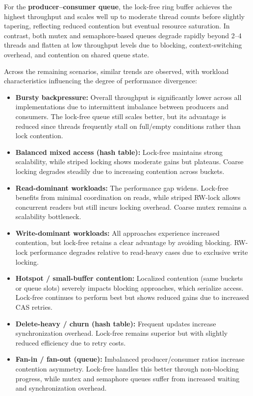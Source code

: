 \documentclass[conference]{IEEEtran}
\begin{document}
For the \textbf{producer--consumer queue}, the lock-free ring buffer achieves the highest throughput and scales well up to moderate thread counts before slightly tapering, reflecting reduced contention but eventual resource saturation. In contrast, both mutex and semaphore-based queues degrade rapidly beyond 2--4 threads and flatten at low throughput levels due to blocking, context-switching overhead, and contention on shared queue state.

Across the remaining scenarios, similar trends are observed, with workload characteristics influencing the degree of performance divergence:

\begin{itemize}
    \item \textbf{Bursty backpressure:} Overall throughput is significantly lower across all implementations due to intermittent imbalance between producers and consumers. The lock-free queue still scales better, but its advantage is reduced since threads frequently stall on full/empty conditions rather than lock contention.
    
    \item \textbf{Balanced mixed access (hash table):} Lock-free maintains strong scalability, while striped locking shows moderate gains but plateaus. Coarse locking degrades steadily due to increasing contention across buckets.
    
    \item \textbf{Read-dominant workloads:} The performance gap widens. Lock-free benefits from minimal coordination on reads, while striped RW-lock allows concurrent readers but still incurs locking overhead. Coarse mutex remains a scalability bottleneck.
    
    \item \textbf{Write-dominant workloads:} All approaches experience increased contention, but lock-free retains a clear advantage by avoiding blocking. RW-lock performance degrades relative to read-heavy cases due to exclusive write locking.
    
    \item \textbf{Hotspot / small-buffer contention:} Localized contention (same buckets or queue slots) severely impacts blocking approaches, which serialize access. Lock-free continues to perform best but shows reduced gains due to increased CAS retries.
    
    \item \textbf{Delete-heavy / churn (hash table):} Frequent updates increase synchronization overhead. Lock-free remains superior but with slightly reduced efficiency due to retry costs.
    
    \item \textbf{Fan-in / fan-out (queue):} Imbalanced producer/consumer ratios increase contention asymmetry. Lock-free handles this better through non-blocking progress, while mutex and semaphore queues suffer from increased waiting and synchronization overhead.
\end{itemize}
\end{document}
